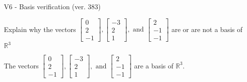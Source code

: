 \begin{exercise}
  \begin{exerciseTitle}V6 - Basis verification (ver. 383)\end{exerciseTitle}
  \begin{exerciseStatement}
    Explain why the vectors \(\left[\begin{array}{r}
0 \\
2 \\
-1
\end{array}\right] , \left[\begin{array}{r}
-3 \\
2 \\
1
\end{array}\right] , \text{ and } \left[\begin{array}{r}
2 \\
-1 \\
-1
\end{array}\right]\) are or are not a basis of \(\mathbb{R}^3\)	


  \end{exerciseStatement}
  \begin{exerciseAnswer}
   The vectors \(\left[\begin{array}{r}
0 \\
2 \\
-1
\end{array}\right] , \left[\begin{array}{r}
-3 \\
2 \\
1
\end{array}\right] , \text{ and } \left[\begin{array}{r}
2 \\
-1 \\
-1
\end{array}\right]\) 
  	 are  a basis of \(\mathbb{R}^3\).
  


  \end{exerciseAnswer}
\end{exercise}